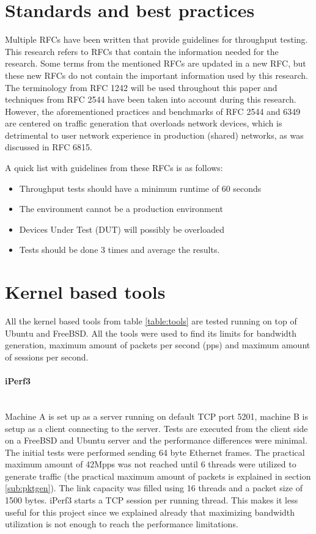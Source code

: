 \section{Standards and best practices}\label{sub:rfc}
Multiple RFCs have been written that provide guidelines for throughput testing.
This research refers to RFCs that contain the information needed for the research.
Some terms from the mentioned RFCs are updated in a new RFC, but these new RFCs do not contain the important information used by this research.
The terminology from RFC 1242\cite{rfc1242} will be used throughout this paper and techniques from RFC 2544 \cite{rfc2544} have been taken into account during this research.
However, the aforementioned practices and benchmarks of RFC 2544 and 6349\cite{rfc6349} are centered on traffic generation that overloads network devices, which is detrimental to user network experience in production (shared) networks, as was discussed in RFC 6815\cite{rfc6815}.

A quick list with guidelines from these RFCs is as follows:

\begin{itemize}
\item{Throughput tests should have a minimum runtime of 60 seconds}
\item{The environment cannot be a production environment}
\item{Devices Under Test (DUT) will possibly be overloaded}
\item{Tests should be done 3 times and average the results.}
\end{itemize} 

\section{Kernel based tools}
All the kernel based tools from table \ref{table:tools} are tested running on top of Ubuntu and FreeBSD.
All the tools were used to find its limits for bandwidth generation, maximum amount of packets per second (pps) and maximum amount of sessions per second.

\paragraph{iPerf3}\mbox{}\\
Machine A is set up as a server running on default TCP port 5201, machine B is setup as a client connecting to the server. 
Tests are executed from the client side on a FreeBSD and Ubuntu server and the performance differences were minimal. 
The initial tests were performed sending 64 byte Ethernet frames. The practical maximum amount of 42Mpps was not reached until 6 threads were utilized to generate traffic (the practical maximum amount of packets is explained in section \ref{sub:pktgen}). 
The link capacity was filled using 16 threads and a packet size of 1500 bytes. 
iPerf3 starts a TCP session per running thread. This makes it less useful for this project since we explained already that maximizing bandwidth utilization is not enough to reach the performance limitations.

